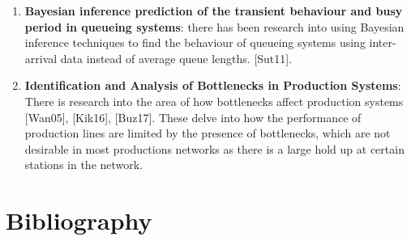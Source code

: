 \documentclass[a4paper,11pt,titlepage]{article}
\begin{document}
\begin{enumerate}
    \item \textbf{Bayesian inference prediction of the transient behaviour and busy period in queueing systems}: there has been research into using Bayesian inference techniques to find the behaviour of queueing systems using inter-arrival data instead of average queue lengths. [Sut11].
    \item \textbf{Identification and Analysis of Bottlenecks in Production Systems}: There is research into the area of how bottlenecks affect production systems [Wan05], [Kik16], [Buz17]. These delve into how the performance of production lines are limited by the presence of bottlenecks, which are not desirable in most productions networks as there is a large hold up at certain stations in the network. 
\end{enumerate}

\clearpage

\section{Bibliography}
\end{document}

